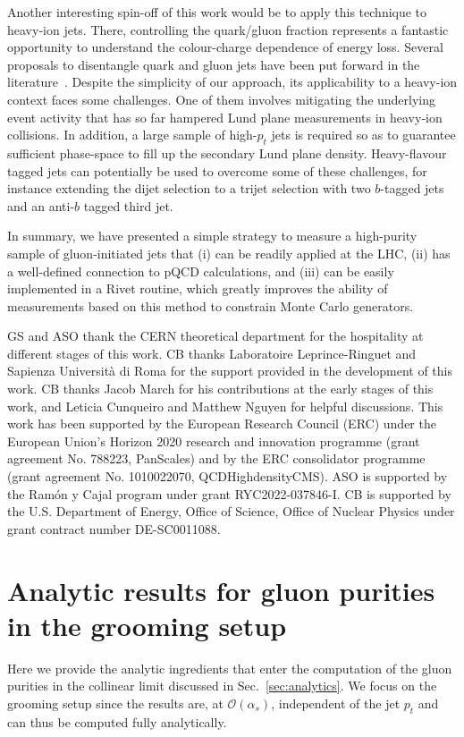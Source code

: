 \documentclass[a4paper,11pt]{article}
\begin{document}
Another interesting spin-off of this work would be to apply this technique to heavy-ion jets. There, controlling the quark/gluon fraction represents a fantastic opportunity to understand the colour-charge dependence of energy loss. Several proposals to disentangle quark and gluon jets have been put forward in the literature~\cite{Chien:2018dfn,Li:2019dre,Brewer:2020och,Brewer:2021hmh,Ying:2022jvy,CMS:2020plq,Zhang:2023oid}. Despite the simplicity of our approach, its applicability to a heavy-ion context faces some challenges. One of them involves mitigating the underlying event activity that has so far hampered Lund plane measurements in heavy-ion collisions. In addition, a large sample of high-$p_t$ jets is required so as to guarantee sufficient phase-space to fill up the secondary Lund plane density. Heavy-flavour tagged jets can potentially be used to overcome some of these challenges, for instance extending the dijet selection to a trijet selection with two $b$-tagged jets and an anti-$b$ tagged third jet.

In summary, we have presented a simple strategy to measure a high-purity sample of gluon-initiated jets that (i) can be readily applied at the LHC, (ii) has a well-defined connection to pQCD calculations, and (iii) can be easily implemented in a Rivet \cite{Bierlich:2019rhm} routine, which greatly improves the ability of measurements based on this method to constrain Monte Carlo generators.

\acknowledgments
GS and ASO thank the CERN theoretical department for the hospitality at different stages of this work. CB thanks Laboratoire Leprince-Ringuet and Sapienza Universit\`{a} di Roma for the support provided in the development of this work. CB thanks Jacob March for his contributions at the early stages of this work, and Leticia Cunqueiro and Matthew Nguyen for helpful discussions. This work has been supported by the European Research Council (ERC) under the European Union’s Horizon 2020 research and innovation programme (grant agreement No. 788223, PanScales) and by the ERC consolidator programme (grant agreement No. 1010022070, QCDHighdensityCMS). ASO is supported by the Ramón y Cajal program under grant RYC2022-037846-I. CB is supported by the U.S. Department of Energy, Office of Science, Office of Nuclear Physics under grant contract number DE-SC0011088.

\appendix{}
\section{Analytic results for gluon purities in the grooming setup}
\label{app:analytics}
Here we provide the analytic ingredients that enter the computation of the gluon purities in the collinear limit discussed in Sec.~\ref{sec:analytics}. We focus on the grooming setup since the results are, at $\mathcal{O}(\alpha_s)$, independent of the jet $p_t$ and can thus be computed fully analytically. 
\end{document}
